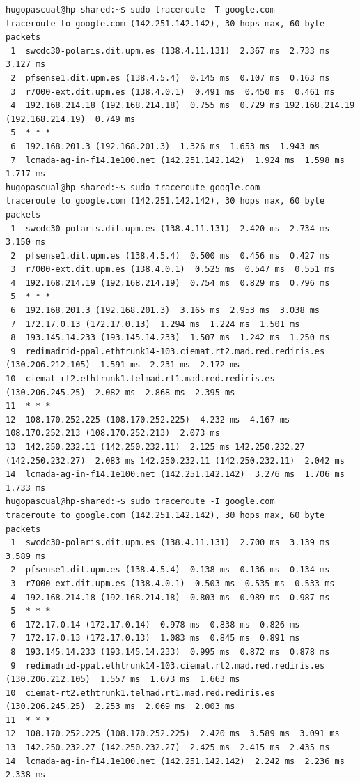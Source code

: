 \begin{verbatim}
hugopascual@hp-shared:~$ sudo traceroute -T google.com
traceroute to google.com (142.251.142.142), 30 hops max, 60 byte packets
 1  swcdc30-polaris.dit.upm.es (138.4.11.131)  2.367 ms  2.733 ms  3.127 ms
 2  pfsense1.dit.upm.es (138.4.5.4)  0.145 ms  0.107 ms  0.163 ms
 3  r7000-ext.dit.upm.es (138.4.0.1)  0.491 ms  0.450 ms  0.461 ms
 4  192.168.214.18 (192.168.214.18)  0.755 ms  0.729 ms 192.168.214.19 (192.168.214.19)  0.749 ms
 5  * * *
 6  192.168.201.3 (192.168.201.3)  1.326 ms  1.653 ms  1.943 ms
 7  lcmada-ag-in-f14.1e100.net (142.251.142.142)  1.924 ms  1.598 ms  1.717 ms
hugopascual@hp-shared:~$ sudo traceroute google.com
traceroute to google.com (142.251.142.142), 30 hops max, 60 byte packets
 1  swcdc30-polaris.dit.upm.es (138.4.11.131)  2.420 ms  2.734 ms  3.150 ms
 2  pfsense1.dit.upm.es (138.4.5.4)  0.500 ms  0.456 ms  0.427 ms
 3  r7000-ext.dit.upm.es (138.4.0.1)  0.525 ms  0.547 ms  0.551 ms
 4  192.168.214.19 (192.168.214.19)  0.754 ms  0.829 ms  0.796 ms
 5  * * *
 6  192.168.201.3 (192.168.201.3)  3.165 ms  2.953 ms  3.038 ms
 7  172.17.0.13 (172.17.0.13)  1.294 ms  1.224 ms  1.501 ms
 8  193.145.14.233 (193.145.14.233)  1.507 ms  1.242 ms  1.250 ms
 9  redimadrid-ppal.ethtrunk14-103.ciemat.rt2.mad.red.rediris.es (130.206.212.105)  1.591 ms  2.231 ms  2.172 ms
10  ciemat-rt2.ethtrunk1.telmad.rt1.mad.red.rediris.es (130.206.245.25)  2.082 ms  2.868 ms  2.395 ms
11  * * *
12  108.170.252.225 (108.170.252.225)  4.232 ms  4.167 ms 108.170.252.213 (108.170.252.213)  2.073 ms
13  142.250.232.11 (142.250.232.11)  2.125 ms 142.250.232.27 (142.250.232.27)  2.083 ms 142.250.232.11 (142.250.232.11)  2.042 ms
14  lcmada-ag-in-f14.1e100.net (142.251.142.142)  3.276 ms  1.706 ms  1.733 ms
hugopascual@hp-shared:~$ sudo traceroute -I google.com
traceroute to google.com (142.251.142.142), 30 hops max, 60 byte packets
 1  swcdc30-polaris.dit.upm.es (138.4.11.131)  2.700 ms  3.139 ms  3.589 ms
 2  pfsense1.dit.upm.es (138.4.5.4)  0.138 ms  0.136 ms  0.134 ms
 3  r7000-ext.dit.upm.es (138.4.0.1)  0.503 ms  0.535 ms  0.533 ms
 4  192.168.214.18 (192.168.214.18)  0.803 ms  0.989 ms  0.987 ms
 5  * * *
 6  172.17.0.14 (172.17.0.14)  0.978 ms  0.838 ms  0.826 ms
 7  172.17.0.13 (172.17.0.13)  1.083 ms  0.845 ms  0.891 ms
 8  193.145.14.233 (193.145.14.233)  0.995 ms  0.872 ms  0.878 ms
 9  redimadrid-ppal.ethtrunk14-103.ciemat.rt2.mad.red.rediris.es (130.206.212.105)  1.557 ms  1.673 ms  1.663 ms
10  ciemat-rt2.ethtrunk1.telmad.rt1.mad.red.rediris.es (130.206.245.25)  2.253 ms  2.069 ms  2.003 ms
11  * * *
12  108.170.252.225 (108.170.252.225)  2.420 ms  3.589 ms  3.091 ms
13  142.250.232.27 (142.250.232.27)  2.425 ms  2.415 ms  2.435 ms
14  lcmada-ag-in-f14.1e100.net (142.251.142.142)  2.242 ms  2.236 ms  2.338 ms
\end{verbatim}

